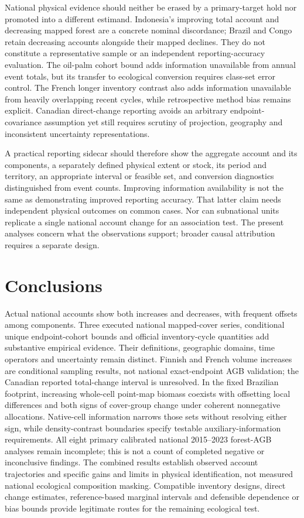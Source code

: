 \documentclass[11pt,a4paper]{article}
\begin{document}
National physical evidence should neither be erased by a primary-target hold nor promoted into a different estimand. Indonesia's improving total account and decreasing mapped forest are a concrete nominal discordance; Brazil and Congo retain decreasing accounts alongside their mapped declines. They do not constitute a representative sample or an independent reporting-accuracy evaluation. The oil-palm cohort bound adds information unavailable from annual event totals, but its transfer to ecological conversion requires class-set error control. The French longer inventory contrast also adds information unavailable from heavily overlapping recent cycles, while retrospective method bias remains explicit. Canadian direct-change reporting avoids an arbitrary endpoint-covariance assumption yet still requires scrutiny of projection, geography and inconsistent uncertainty representations.

A practical reporting sidecar should therefore show the aggregate account and its components, a separately defined physical extent or stock, its period and territory, an appropriate interval or feasible set, and conversion diagnostics distinguished from event counts. Improving information availability is not the same as demonstrating improved reporting accuracy. That latter claim needs independent physical outcomes on common cases. Nor can subnational units replicate a single national account change for an association test. The present analyses concern what the observations support; broader causal attribution requires a separate design.

\section{Conclusions}
Actual national accounts show both increases and decreases, with frequent offsets among components. Three executed national mapped-cover series, conditional unique endpoint-cohort bounds and official inventory-cycle quantities add substantive empirical evidence. Their definitions, geographic domains, time operators and uncertainty remain distinct. Finnish and French volume increases are conditional sampling results, not national exact-endpoint AGB validation; the Canadian reported total-change interval is unresolved. In the fixed Brazilian footprint, increasing whole-cell point-map biomass coexists with offsetting local differences and both signs of cover-group change under coherent nonnegative allocations. Native-cell information narrows those sets without resolving either sign, while density-contrast boundaries specify testable auxiliary-information requirements. All eight primary calibrated national 2015--2023 forest-AGB analyses remain incomplete; this is not a count of completed negative or inconclusive findings. The combined results establish observed account trajectories and specific gains and limits in physical identification, not measured national ecological composition masking. Compatible inventory designs, direct change estimates, reference-based marginal intervals and defensible dependence or bias bounds provide legitimate routes for the remaining ecological test.
\end{document}
